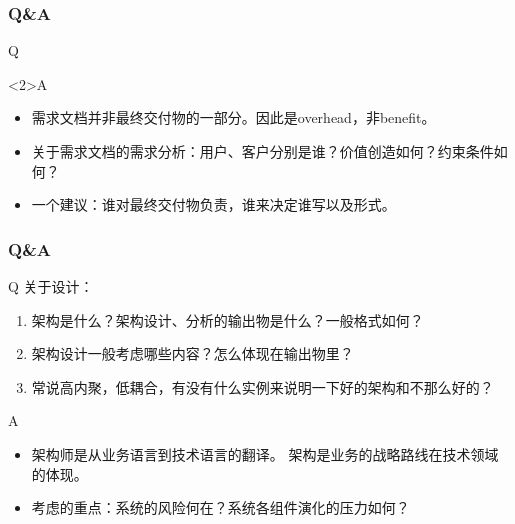\documentclass[UTF8,lualatex]{ctexbeamer}
\begin{document}
\begin{frame}
    \frametitle{Q\&A}
    \begin{alertblock}{Q}
    \end{alertblock}
    \begin{block}<2>{A}
        \begin{itemize}
            \item 需求文档并非最终交付物的一部分。因此是overhead，非benefit。
            \item 关于需求文档的需求分析：用户、客户分别是谁？价值创造如何？约束条件如何？
            \item 一个建议：谁对最终交付物负责，谁来决定谁写以及形式。
        \end{itemize}
    \end{block}
\end{frame}

\begin{frame}
    \frametitle{Q\&A}
    \begin{alertblock}{Q}
        关于设计：
        \begin{enumerate}
            \item 架构是什么？架构设计、分析的输出物是什么？一般格式如何？
            \item 架构设计一般考虑哪些内容？怎么体现在输出物里？
            \item 常说高内聚，低耦合，有没有什么实例来说明一下好的架构和不那么好的？
        \end{enumerate}
    \end{alertblock}
    \begin{block}{A}
        \begin{itemize}
            \item 架构师是从业务语言到技术语言的翻译。
                架构是业务的战略路线在技术领域的体现。
            \item 考虑的重点：系统的风险何在？系统各组件演化的压力如何？
        \end{itemize}
    \end{block}
\end{frame}
\end{document}
